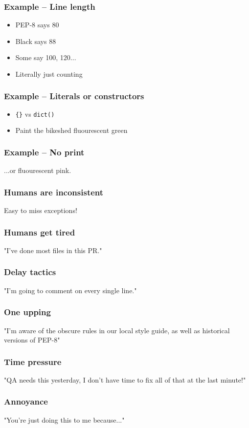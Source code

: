\begin{frame}
\frametitle{Example -- Line length}
\begin{itemize}
\item PEP-8 says 80
\item Black says 88
\item Some say 100, 120...
\item Literally just counting
\end{itemize}
\end{frame}

\begin{frame}[fragile]
\frametitle{Example -- Literals or constructors}
\begin{itemize}
\item \verb|{}| vs \verb|dict()|
\item Paint the bikeshed fluourescent green
\end{itemize}
\end{frame}

\begin{frame}
\frametitle{Example -- No print}
...or fluourescent pink.
\end{frame}

\begin{frame}
\frametitle{Humans are inconsistent}
Easy to miss exceptions!
\end{frame}

\begin{frame}
\frametitle{Humans get tired}
"I've done most files in this PR."
\end{frame}

\begin{frame}
\frametitle{Delay tactics}
"I'm going to comment on every single line."
\end{frame}

\begin{frame}
\frametitle{One upping}
"I'm aware of the obscure rules in our local style guide,
as well as historical versions of PEP-8"
\end{frame}

\begin{frame}
\frametitle{Time pressure}
"QA needs this yesterday,
I don't have time to fix all of that at the last minute!"
\end{frame}

\begin{frame}
\frametitle{Annoyance}
"You're just doing this to me because..."
\end{frame}

